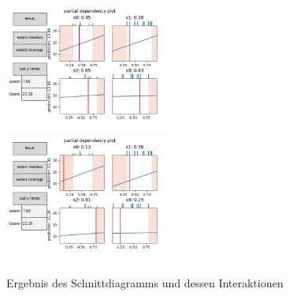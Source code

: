 \begin{figure}[H]
    \includegraphics[width=0.5\textwidth]{images/exm_schnittdiagramm.png}
    \hfill
    \includegraphics[width=0.5\textwidth]{images/exm_schnittdiagramm_after_moving.png}
    \caption{Ergebnis des Schnittdiagramms und dessen Interaktionen}
    \label{fig:eval_partial_dependency}
\end{figure}

